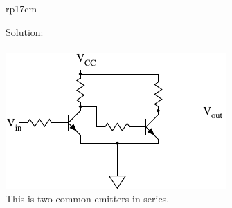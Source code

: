 \documentclass{article}
\begin{document}
\begin{longtable}[l]{rp{17cm}}
\begin{minipage}[t]{\linewidth}
Solution: \\ \\
\includegraphics{../TTLCircuits/Assessments/TTLBuffer}
\\
This is two common emitters in series.
\end{minipage}\\
\medskip
\end{longtable}
\end{document}
